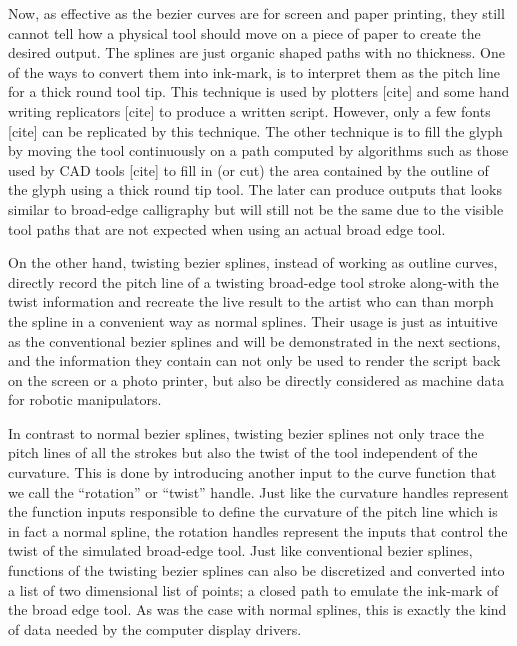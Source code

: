     Now, as effective as the bezier curves are for screen and paper printing, they still cannot tell how a physical tool should move on a piece of paper to create the desired output. The splines are just organic shaped paths with no thickness. One of the ways to convert them into ink-mark, is to interpret them as the pitch line for a thick round tool tip. This technique is used by plotters [cite] and some hand writing replicators [cite] to produce a written script. However, only a few fonts [cite] can be replicated by this technique. The other technique is to fill the glyph by moving the tool continuously on a path computed by algorithms such as those used by CAD tools [cite] to fill in (or cut) the area contained by the outline of the glyph using a thick round tip tool. The later can produce outputs that looks similar to broad-edge calligraphy but will still not be the same due to the visible tool paths that are not expected when using an actual broad edge tool.


    On the other hand, twisting bezier splines, instead of working as outline curves, directly record the pitch line of a twisting broad-edge tool stroke along-with the twist information and recreate the live result to the artist who can than morph the spline in a convenient way as normal splines. Their usage is just as intuitive as the conventional bezier splines and will be demonstrated in the next sections, and the information they contain can not only be used to render the script back on the screen or a photo printer, but also be directly considered as machine data for robotic manipulators.

    In contrast to normal bezier splines, twisting bezier splines not only trace the pitch lines of all the strokes but also the twist of the tool independent of the curvature. This is done by introducing another input to the curve function that we call the ``rotation'' or ``twist'' handle. Just like the curvature handles represent the function inputs responsible to define the curvature of the pitch line which is in fact a normal spline, the rotation handles represent the inputs that control the twist of the simulated broad-edge tool. Just like conventional bezier splines, functions of the twisting bezier splines can also be discretized and converted into a list of two dimensional list of points; a closed path to emulate the ink-mark of the broad edge tool. As was the case with normal splines, this is exactly the kind of data needed by the computer display drivers.

